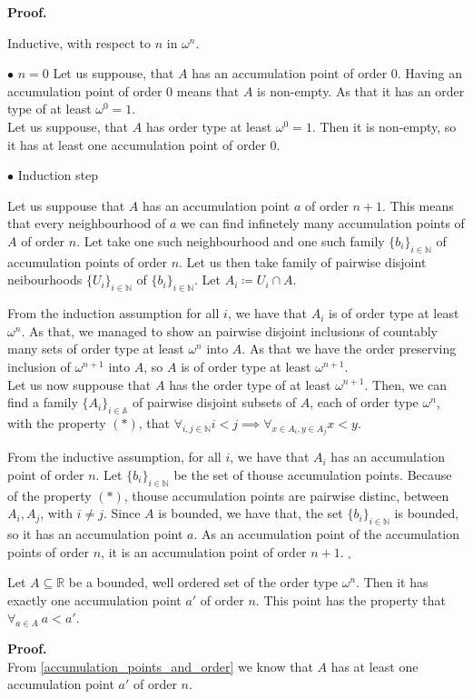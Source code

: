 \textbf{Proof.} 

Inductive, with respect to $n$ in $\omega^n$.

$\bullet$ $n=0$
Let us suppouse, that $A$ has an accumulation point of order $0$.
Having an accumulation point of order $0$ means that $A$ is non-empty. As that it has an order 
type of at least $\omega^0 = 1$. \\

Let us suppouse, that $A$ has order type at least $\omega^0=1$. Then it is non-empty, so it 
has at least one accumulation point of order $0$. 

$\bullet$ Induction step

Let us suppouse that $A$ has an accumulation point $a$ of order $n+1$. This means that every 
neighbourhood of $a$ we can find infinetely many accumulation points of $A$ of order $n$. 
Let take one such neighbourhood and one such family $\{b_i\}_{i \in \mathbb{N}}$ 
of accumulation points of order $n$. 
Let us then take family of pairwise disjoint neibourhoods $\{U_i\}_{i\in\mathbb{N}}$ of 
$\{b_i\}_{i \in \mathbb{N}}$. Let $A_i \coloneqq U_i\cap A$. 

From the induction assumption for all $i$, we have that $A_i$ is of order type at least 
$\omega^n$. As that, we managed to show an pairwise disjoint inclusions of countably many sets 
of order type at least $\omega^n$ into $A$. As that we have the order preserving inclusion of 
$\omega^{n+1}$ into $A$, so $A$ is of order type at least $\omega^{n+1}$. \\

Let us now suppouse that $A$ has the order type of at least $\omega^{n+1}$. Then, we can find 
a family $\{A_i\}_{i \in \mathbb{A}}$ 
of pairwise disjoint subsets of $A$, each of order type $\omega^{n}$, with the property $(\ast)$, 
that $\forall_{i,j\in\mathbb{N}}i<j \implies \forall_{x \in A_i,y\in A_j} x< y$. 

From the inductive 
assumption, for all $i$, we have that $A_i$ has an accumulation point of order $n$. Let 
$\{b_i\}_{i\in\mathbb{N}}$ be the set of thouse accumulation points.
Because of the property $(\ast)$, thouse accumulation points are pairwise distinc, between 
$A_i, A_j$, with $i\neq j$. Since $A$ is bounded, we have that, the set $\{b_i\}_{i\in\mathbb{N}}$ 
is bounded, so it has an accumulation point $a$. As an accumulation point of the accumulation 
points of order $n$, it is an accumulation point of order $n+1$. $_\square$ 

\begin{corollary}\label{that_important_corollary}
Let $A \subseteq \mathbb{R}$ be a bounded, well ordered set of the order type $\omega^n$. Then 
it has exactly one accumulation point $a'$ of order $n$. This point has the property that 
$\forall_{a\in A}\ a<a'$.  
\end{corollary}
\textbf{Proof.}\\ 
From \ref{accumulation_points_and_order} we know that $A$ has at least one accumulation point 
$a'$ of order $n$. 

